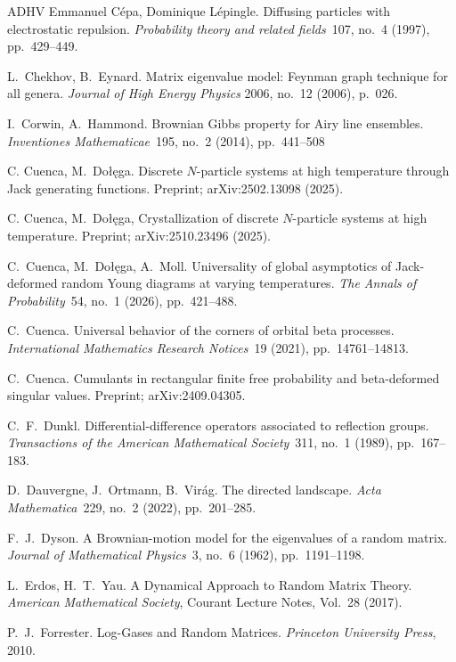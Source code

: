\documentclass[11pt]{article}
\theoremstyle{plain}
\begin{document}
\begin{thebibliography}{ADHV}
Emmanuel C{\'e}pa, Dominique L{\'e}pingle. Diffusing particles with electrostatic repulsion. \emph{Probability theory and related fields}~107, no.~4 (1997), pp.~429--449.

L.~Chekhov, B.~Eynard. Matrix eigenvalue model: Feynman graph technique for all genera. \emph{Journal of High Energy Physics} 2006, no.~12 (2006), p.~026.

I.~Corwin, A.~Hammond. Brownian Gibbs property for Airy line ensembles. \emph{Inventiones Mathematicae}~195, no.~2 (2014), pp.~441--508

C. Cuenca, M.~Do\l{}\k{e}ga. Discrete $N$-particle systems at high temperature through Jack generating functions. Preprint; arXiv:2502.13098 (2025).

C. Cuenca, M.~Do\l{}\k{e}ga, Crystallization of discrete $N$-particle systems at high temperature. Preprint; arXiv:2510.23496 (2025).

C.~Cuenca, M.~Do\l{}\k{e}ga, A.~Moll. Universality of global asymptotics of Jack-deformed random Young diagrams at varying temperatures. \emph{The Annals of Probability}~54, no.~1 (2026), pp.~421--488.

C.~Cuenca. Universal behavior of the corners of orbital beta processes. \emph{International Mathematics Research Notices}~19 (2021), pp.~14761--14813.

C.~Cuenca. Cumulants in rectangular finite free probability and beta-deformed singular values. Preprint; arXiv:2409.04305.

C.~F.~Dunkl. Differential-difference operators associated to reflection groups. \emph{Transactions of the American Mathematical Society}~311, no.~1 (1989), pp.~167--183.

 D.~Dauvergne, J.~Ortmann, B.~Vir{\'a}g. The directed landscape.
\emph{Acta Mathematica}~229, no.~2 (2022), pp.~201--285.

F.~J.~Dyson. A Brownian-motion model for the eigenvalues of a random matrix.
\emph{Journal of Mathematical Physics}~3, no.~6 (1962), pp.~1191--1198.

L.~Erdos, H.~T.~Yau. A Dynamical Approach to Random Matrix Theory. \emph{American Mathematical Society}, Courant Lecture Notes, Vol.~28 (2017).

P.~J.~Forrester. Log-Gases and Random Matrices. \emph{Princeton University Press}, 2010.


\end{thebibliography}
\end{document}
